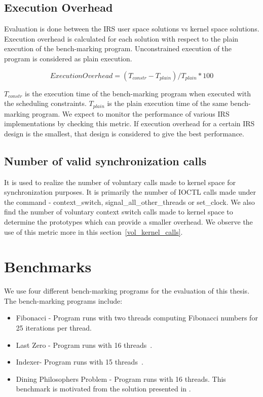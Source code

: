 \subsection{Execution Overhead}

Evaluation is done between the IRS user space solutions vs kernel space solutions. 
Execution overhead is calculated for each solution with respect to the plain execution of the bench-marking program. 
Unconstrained execution of the program is considered as plain execution. 

$$Execution Overhead = (T_{constr} - T_{plain})/T_{plain} * 100$$

$T_{constr}$ is the execution time of the bench-marking program when executed with the scheduling constraints. 
$T_{plain}$ is the plain execution time of the same bench-marking program. 
We expect to monitor the performance of various IRS implementations by checking this metric. 
If execution overhead for a certain IRS design is the smallest, that design is considered to give the best performance. 

\subsection{Number of valid synchronization calls} 

It is used to realize the number of voluntary calls made to kernel space for synchronization purposes. 
It is primarily the number of IOCTL calls made under the command - context\_switch, signal\_all\_other\_threads or set\_clock. 
We also find the number of voluntary context switch calls made to kernel space to determine the prototypes which can provide a smaller overhead. We observe the use of this metric more in this section~\ref{vol_kernel_calls}.


\section{Benchmarks}

We use four different bench-marking programs for the evaluation of this thesis. 
The bench-marking programs include:
\begin{itemize}
\item{Fibonacci} - Program runs with two threads computing Fibonacci numbers for 25 iterations per thread.
\item{Last Zero} - Program runs with 16 threads~\citep{abdulla2014optimal}.
\item{Indexer}- Program runs with 15 threads~\citep{dynamic_por}.
\item{Dining Philosophers Problem} - Program runs with 16 threads. 
This benchmark is motivated from the solution presented in \citet{silberschatz2014operating}.
\end{itemize}

